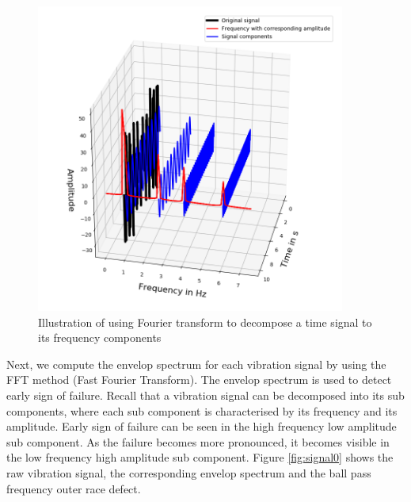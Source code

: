 \documentclass[11pt, oneside]{article}   	%
\begin{document}
\begin{flushleft}
\begin{figure}[H] %
   \centering
   \includegraphics[width=4in]{decomposition} 
   \caption{Illustration of using Fourier transform to decompose a time signal to its frequency components}
   \label{fig:decomp}
\end{figure}

Next, we compute the envelop spectrum for each vibration signal by using the FFT method (Fast Fourier Transform). The envelop spectrum is used to detect early sign of failure. Recall that a vibration signal can be decomposed into its sub components, where each  sub component 
is characterised by its frequency and its amplitude. Early sign of failure can be seen in the high frequency low amplitude sub component. As the failure becomes more pronounced, it becomes visible in the low frequency high amplitude sub component. Figure \ref{fig:signal0} shows the raw vibration signal, the corresponding envelop spectrum and the ball pass frequency outer race defect.
\end{flushleft}
\end{document}

